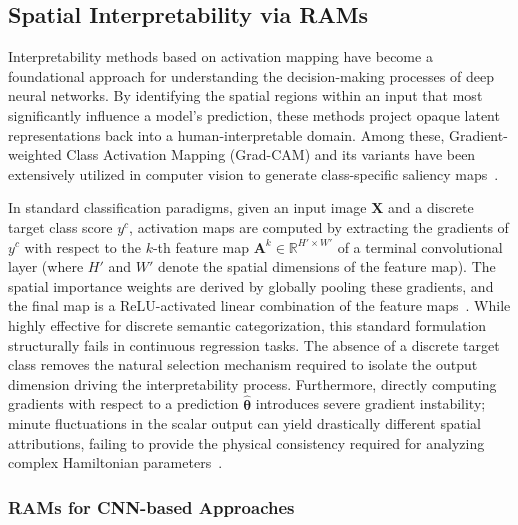 \documentclass[final,5p,times,twocolumn]{elsarticle}
\begin{document}
\subsection{Spatial Interpretability via RAMs}\label{sec:RAMs}

Interpretability methods based on activation mapping have become a foundational approach for understanding the decision-making processes of deep neural networks. By identifying the spatial regions within an input that most significantly influence a model's prediction, these methods project opaque latent representations back into a human-interpretable domain. Among these, Gradient-weighted Class Activation Mapping (Grad-CAM) and its variants have been extensively utilized in computer vision to generate class-specific saliency maps~\cite{vinogradova2020gradcam}. 

In standard classification paradigms, given an input image $\mathbf{X}$ and a discrete target class score $y^c$, activation maps are computed by extracting the gradients of $y^c$ with respect to the $k$-th feature map $\mathbf{A}^k \in \mathbb{R}^{H' \times W'}$ of a terminal convolutional layer (where $H'$ and $W'$ denote the spatial dimensions of the feature map). The spatial importance weights are derived by globally pooling these gradients, and the final map is a ReLU-activated linear combination of the feature maps~\cite{zhang2024gradcam}. While highly effective for discrete semantic categorization, this standard formulation structurally fails in continuous regression tasks. The absence of a discrete target class removes the natural selection mechanism required to isolate the output dimension driving the interpretability process. Furthermore, directly computing gradients with respect to a prediction $\hat{\boldsymbol{\theta}}$ introduces severe gradient instability; minute fluctuations in the scalar output can yield drastically different spatial attributions, failing to provide the physical consistency required for analyzing complex Hamiltonian parameters~\cite{makke2024symbolic}.

\subsubsection{RAMs for CNN-based Approaches}\label{sec:CNN_RAMs}
\end{document}
